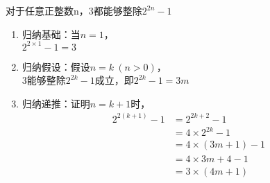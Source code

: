 \begin{tcolorbox}
	对于任意正整数n，3都能够整除$ 2^{2n} - 1 $
	\begin{enumerate}
		\item 归纳基础：当$ n = 1 $，\\
		      $ 2^{2 \times 1} -1 = 3 $

		\item 归纳假设：假设$ n = k\ (n > 0) $，\\
		      3能够整除$ 2^{2k} - 1 $成立，即$ 2^{2k} - 1 = 3m $

		\item 归纳递推：证明$ n = k + 1 $时，
		      \begin{align*}
			      2^{2(k+1)} - 1 & = 2^{2k+2} - 1          \\
			                     & = 4 \times 2^{2k} - 1   \\
			                     & = 4 \times (3m + 1) - 1 \\
			                     & = 4 \times 3m + 4 - 1   \\
			                     & =3 \times (4m + 1)
		      \end{align*}
	\end{enumerate}
\end{tcolorbox}

\newpage
